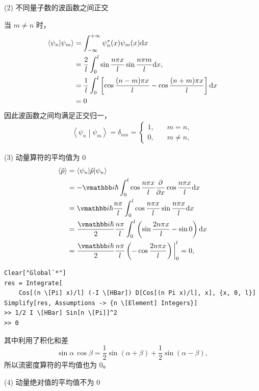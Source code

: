 (2) 不同量子数的波函数之间正交

当 $m \neq n$ 时，
\begin{align}
    \left\langle \psi_n \middle | \psi_m \right\rangle 
    &= \int_{- \infty}^{+ \infty} \psi_n^* (x) \psi_m(x) \mathrm{d} x \\
    &= \frac2l \int_0^l \sin \frac{n\pi x}{l} \sin \frac{n\pi m }{l} \mathrm{d} x, \\
    &= \frac 1l \int_0^l \left[
        \cos \frac{(n-m)\pi x}l - \cos\frac{(n+m)\pi x}l
    \right] \mathrm{d} x \\
    &= 0
\end{align}
因此波函数之间均满足正交归一，
\begin{eqnarray}
    \left\langle \psi_n \middle | \psi_m \right\rangle = \delta_{mn} = \begin{cases}
        1, \quad &m=n,\\
        0, \quad &m\neq n,
    \end{cases}
\end{eqnarray}

(3) 动量算符的平均值为 0
\begin{align}
    \ev{\hat p} 
    &= \left\langle \psi_n \middle| \hat p \middle| \psi_n \right\rangle \\
    &= - \ii \hbar \int_0^l \cos\frac{n \pi x}l \frac{\partial}{\partial x} \cos \frac{n\pi x}l \dd x \\
    &= \ii\hbar \frac{n\pi}l \int_0^l \cos \frac{n\pi x}l \sin\frac{n\pi x}l \dd x \\
    &= \frac{\ii\hbar}2 \frac{n\pi}l \int_0^l \left(\sin\frac{2n\pi x}{l} - \sin 0\right)\dd x \\
    &= \frac{\ii\hbar}2 \frac{n\pi}l \left(- \cos \frac{2n\pi x}l\right) \bigg|_0^l = 0,  
\end{align}
\begin{lstlisting}
Clear["Global`*"]
res = Integrate[
    Cos[(n \[Pi] x)/l] (-I \[HBar]) D[Cos[(n Pi x)/l], x], {x, 0, l}]
Simplify[res, Assumptions -> {n \[Element] Integers}]
>> 1/2 I \[HBar] Sin[n \[Pi]]^2
>> 0
\end{lstlisting}
其中利用了积化和差
\begin{equation}
    \sin\alpha \, \cos\beta = \frac12 \sin(\alpha+\beta) + \frac12 \sin(\alpha-\beta),
\end{equation}
所以流密度算符的平均值也为 0。

(4) 动量绝对值的平均值不为 0

